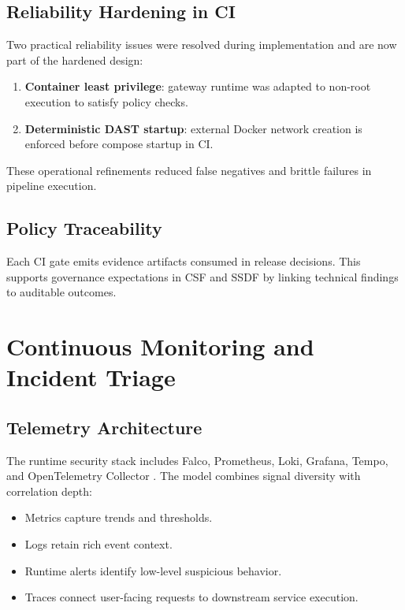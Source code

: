 \documentclass[conference]{IEEEtran}
\begin{document}
\subsection{Reliability Hardening in CI}
Two practical reliability issues were resolved during implementation and are now part of the hardened design:
\begin{enumerate}
\item \textbf{Container least privilege}: gateway runtime was adapted to non-root execution to satisfy policy checks.
\item \textbf{Deterministic DAST startup}: external Docker network creation is enforced before compose startup in CI.
\end{enumerate}

These operational refinements reduced false negatives and brittle failures in pipeline execution.

\subsection{Policy Traceability}
Each CI gate emits evidence artifacts consumed in release decisions. This supports governance expectations in CSF and SSDF by linking technical findings to auditable outcomes.

\section{Continuous Monitoring and Incident Triage}
\subsection{Telemetry Architecture}
The runtime security stack includes Falco, Prometheus, Loki, Grafana, Tempo, and OpenTelemetry Collector \cite{falco,prometheus,loki,grafana,tempo,opentelemetry}. The model combines signal diversity with correlation depth:
\begin{itemize}
\item Metrics capture trends and thresholds.
\item Logs retain rich event context.
\item Runtime alerts identify low-level suspicious behavior.
\item Traces connect user-facing requests to downstream service execution.
\end{itemize}
\end{document}
